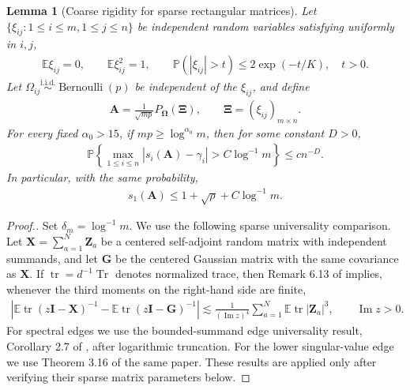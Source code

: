 \documentclass[numsec,webpdf,modern,large,namedate]{oup-authoring-template}
\theoremstyle{plain}
\newtheorem{slemma}{Lemma}%
\theoremstyle{remark}
\newcommand{\bOmega}{\bm{\Omega}}
\newif\ifmarkchanges
\newenvironment{revision}{\begingroup\ifmarkchanges\color{red}\fi}{\endgroup}
\begin{document}
\begin{revision}
\begin{slemma}[Coarse rigidity for sparse rectangular matrices]
\label{lem:sparse_coarse_rigidity}
Let $\{\xi_{ij}:1\le i\le m,1\le j\le n\}$ be independent random variables satisfying uniformly in $i,j$,
\begin{align}
\label{eq:supp_sparse_entry_assumption}
    \mathbb E\xi_{ij}=0,\qquad
    \mathbb E\xi_{ij}^2=1,\qquad
    \mathbb P(|\xi_{ij}|>t)\le 2\exp(-t/K),\quad t>0.
\end{align}
Let $\Omega_{ij}\stackrel{\mathrm{i.i.d.}}{\sim}\operatorname{Bernoulli}(p)$ be independent of the $\xi_{ij}$, and define
\begin{align*}
    \bm A=\frac{1}{\sqrt{mp}}P_{\bOmega}(\bm\Xi),
    \qquad \bm\Xi=(\xi_{ij})_{m\times n}.
\end{align*}
For every fixed $\alpha_0>15$, if $mp\ge\log^{\alpha_0}m$, then for some constant $D>0$,
\begin{align}
\label{eq:supp_sparse_coarse_rigidity}
    \mathbb P\left
    \{\max_{1\le i\le n}|s_i(\bm A)-\gamma_i|
    >C\log^{-1}m\right\}
    \le c n^{-D}.
\end{align}
In particular, with the same probability,
\begin{align}
\label{eq:supp_sparse_edge_bound}
    s_1(\bm A)\le1+\sqrt\rho+C\log^{-1}m.
\end{align}
\end{slemma}
\begin{proof}[Proof.]
Set $\delta_m=\log^{-1}m$. We use the following sparse universality comparison.
Let $\bm X=\sum_{a=1}^N\bm Z_a$ be a centered self-adjoint random matrix with
independent summands, and let $\bm G$ be the centered Gaussian matrix with the
same covariance as $\bm X$.  If $\operatorname{tr}=d^{-1}\operatorname{Tr}$
denotes normalized trace, then Remark 6.13 of
\cite{brailovskaya2024universality} implies, whenever the third moments on the
right-hand side are finite,
\begin{align}
\label{eq:supp_bvh_trace_resolvent}
    \left|
    \mathbb E\operatorname{tr}(z\bm I-\bm X)^{-1}
    -\mathbb E\operatorname{tr}(z\bm I-\bm G)^{-1}
    \right|
    \lesssim
    \frac{1}{(\operatorname{Im}z)^4}
    \sum_{a=1}^N\mathbb E\operatorname{tr}|\bm Z_a|^3,
    \qquad \operatorname{Im}z>0.
\end{align}
For spectral edges we use the bounded-summand edge universality result,
Corollary 2.7 of \cite{brailovskaya2024universality}, after logarithmic
truncation.  For the lower singular-value edge we use Theorem 3.16 of the
same paper.  These results are applied only after verifying their sparse
matrix parameters below.


\end{proof}
\end{revision}
\end{document}
